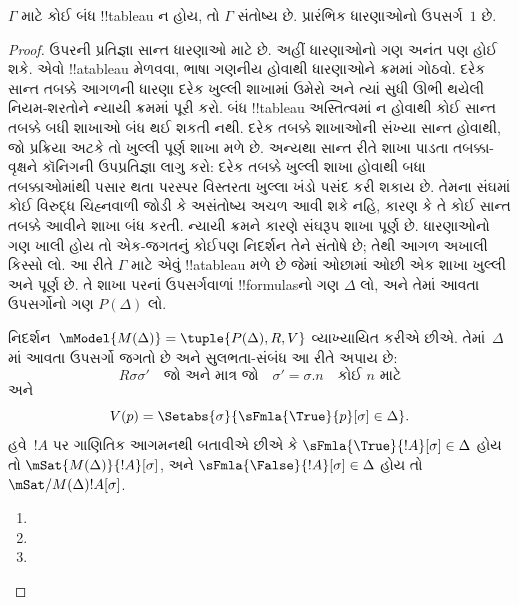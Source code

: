 \documentclass[../../../include/open-logic-section]{subfiles}
\begin{document}
\begin{thm}[પૂર્ણતા]
  $\Gamma$ માટે કોઈ બંધ !!{tableau} ન હોય, તો $\Gamma$ સંતોષ્ય છે.
  પ્રારંભિક ધારણાઓનો ઉપસર્ગ~$1$ છે.
\end{thm}

\begin{proof}
ઉપરની પ્રતિજ્ઞા સાન્ત ધારણાઓ માટે છે. અહીં ધારણાઓનો ગણ
અનંત પણ હોઈ શકે. એવો !!a{tableau} મેળવવા, ભાષા ગણનીય
હોવાથી ધારણાઓને ક્રમમાં
ગોઠવો. દરેક સાન્ત તબક્કે આગળની ધારણા દરેક ખુલ્લી શાખામાં
ઉમેરો અને ત્યાં સુધી ઊભી થયેલી નિયમ-શરતોને ન્યાયી ક્રમમાં
પૂરી કરો. બંધ !!{tableau} અસ્તિત્વમાં ન હોવાથી કોઈ સાન્ત
તબક્કે બધી શાખાઓ બંધ થઈ શકતી નથી. દરેક તબક્કે શાખાઓની
સંખ્યા સાન્ત હોવાથી, જો પ્રક્રિયા અટકે તો ખુલ્લી પૂર્ણ
શાખા મળે છે. અન્યથા સાન્ત રીતે શાખા પાડતા તબક્કા-વૃક્ષને
કૉનિગની ઉપપ્રતિજ્ઞા લાગુ કરો: દરેક તબક્કે ખુલ્લી શાખા હોવાથી
બધા તબક્કાઓમાંથી પસાર થતા પરસ્પર વિસ્તરતા ખુલ્લા ખંડો
પસંદ કરી શકાય છે. તેમના સંઘમાં કોઈ વિરુદ્ધ ચિહ્નવાળી જોડી
કે અસંતોષ્ય અચળ આવી શકે નહિ, કારણ કે તે કોઈ સાન્ત તબક્કે
આવીને શાખા બંધ કરતી. ન્યાયી ક્રમને કારણે સંઘરૂપ શાખા પૂર્ણ છે.
ધારણાઓનો ગણ ખાલી હોય તો એક-જગતનું કોઈપણ નિદર્શન તેને
સંતોષે છે; તેથી આગળ અખાલી કિસ્સો લો.
આ રીતે $\Gamma$ માટે એવું !!a{tableau} મળે છે જેમાં
ઓછામાં ઓછી એક શાખા ખુલ્લી અને પૂર્ણ છે. તે શાખા પરનાં
ઉપસર્ગવાળાં !!{formula}sનો ગણ $\Delta$ લો, અને તેમાં
આવતા ઉપસર્ગોનો ગણ $P(\Delta)$ લો.

નિદર્શન~$\mModel{M(\Delta)} = \tuple{P(\Delta), R, V}$
વ્યાખ્યાયિત કરીએ છીએ. તેમાં~$\Delta$માં આવતા ઉપસર્ગો
જગતો છે અને સુલભતા-સંબંધ આ રીતે અપાય છે:
\[
R\sigma\sigma' \quad \text{જો અને માત્ર જો} \quad
\sigma'=\sigma.n \quad \text{કોઈ~$n$ માટે}
\]
અને
\[
V(p) = \Setabs{\sigma}{\sFmla{\True}{p}[\sigma] \in \Delta}.
\]
હવે~$!A$ પર ગાણિતિક આગમનથી બતાવીએ છીએ કે
$\sFmla{\True}{!A}[\sigma] \in \Delta$ હોય તો
$\mSat{M(\Delta)}{!A}[\sigma]$, અને
$\sFmla{\False}{!A}[\sigma] \in \Delta$ હોય તો
$\mSat/{M(\Delta)}{!A}[\sigma]$.

\begin{enumerate}
  \item {}
  \item {}
  \item {}
\end{enumerate}
\end{proof}
\end{document}
